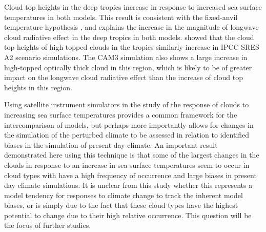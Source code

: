 Cloud top heights in the deep tropics increase in response to increased sea surface temperatures in both models. This result is consistent with the fixed-anvil temperature hypothesis \citep{hartmann_and_larson_2002}, and explains the increase in the magnitude of longwave cloud radiative effect in the deep tropics in both models. \cite{zelinka_and_hartmann_2010} showed that the cloud top heights of high-topped clouds in the tropics similarly increase in IPCC SRES A2 scenario simulations. The CAM3 simulation also shows a large increase in high-topped optically thick cloud in this region, which is likely to be of greater impact on the longwave cloud radiative effect than the increase of cloud top heights in this region.

Using satellite instrument simulators in the study of the response of clouds to increasing sea surface temperatures provides a common framework for the intercomparison of models, but perhaps more importantly allows for changes in the simulation of the perturbed climate to be assessed in relation to identified biases in the simulation of present day climate. An important result demonstrated here using this technique is that some of the largest changes in the clouds in response to an increase in sea surface temperatures seem to occur in cloud types with have a high frequency of occurrence and large biases in present day climate simulations. It is unclear from this study whether this represents a model tendency for responses to climate change to track the inherent model biases, or is simply due to the fact that these cloud types have the highest potential to change due to their high relative occurrence. This question will be the focus of further studies.
